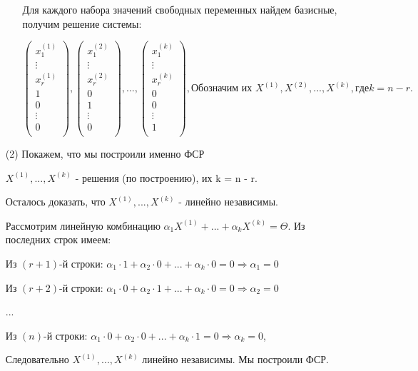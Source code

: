 \begin{enumerate}
\begin{enumerate}
        Для каждого набора значений свободных переменных найдем базисные, получим решение системы:

        $$ 
        \begin{pmatrix}
            x_1^{(1)}\\
            \vdots\\
            x_r^{(1)}\\
            1\\
            0\\
            \vdots\\
            0\\
        \end{pmatrix}
        , 
        \begin{pmatrix}
            x_1^{(2)}\\
            \vdots\\
            x_r^{(2)}\\
            0\\
            1\\
            \vdots\\
            0\\
        \end{pmatrix}
        , ...,
        \begin{pmatrix}
            x_1^{(k)}\\
            \vdots\\
            x_r^{(k)}\\
            0\\
            0\\
            \vdots\\
            1\\
        \end{pmatrix}, \text{Обозначим их } X^{(1)}, X^{(2)}, ..., X^{(k)}, где k = n - r.
        $$
    \end{enumerate}
    
    \vspace*{15pt}

    \item[(2)] Покажем, что мы построили именно ФСР

    $X^{(1)}, ..., X^{(k)}$ - решения (по построению), их k = n - r.
    
    Осталось доказать, что $X^{(1)}, ..., X^{(k)}$ - линейно независимы.

    Рассмотрим линейную комбинацию $\alpha_1X^{(1)} + ... + \alpha_kX^{(k)} = \Theta$. Из последних строк имеем:

    Из $(r+1)$-й строки: $\alpha_1\cdot 1 + \alpha_2\cdot 0 + ... + \alpha_k\cdot 0 = 0 \Rightarrow \alpha_1 = 0$

    Из $(r+2)$-й строки: $\alpha_1\cdot 0 + \alpha_2\cdot 1 + ... + \alpha_k\cdot 0 = 0 \Rightarrow \alpha_2 = 0$

    ...

    Из $(n)$-й строки: $\alpha_1\cdot 0 + \alpha_2\cdot 0 + ... + \alpha_k\cdot 1 = 0 \Rightarrow \alpha_k = 0$,

    Следовательно $X^{(1)}, ..., X^{(k)}$ линейно независимы. Мы построили ФСР.
\end{enumerate}

